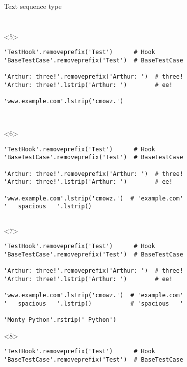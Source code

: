 \begin{frame}[fragile]{Text sequence type}
\begin{columns}[onlytextwidth]
\begin{column}{\textwidth}
\begin{onlyenv}
\begin{lstlisting}[style=python,basicstyle=\ttfamily\small,keepspaces=true,columns=fullflexible]
 \end{lstlisting}
      \end{onlyenv}

      \begin{onlyenv}<5>
        \begin{lstlisting}[style=python,basicstyle=\ttfamily\small,keepspaces=true,columns=fullflexible]
'TestHook'.removeprefix('Test')      # Hook
'BaseTestCase'.removeprefix('Test')  # BaseTestCase

'Arthur: three!'.removeprefix('Arthur: ')  # three!
'Arthur: three!'.lstrip('Arthur: ')        # ee!

'www.example.com'.lstrip('cmowz.')



 \end{lstlisting}
      \end{onlyenv}

      \begin{onlyenv}<6>
        \begin{lstlisting}[style=python,basicstyle=\ttfamily\small,keepspaces=true,columns=fullflexible]
'TestHook'.removeprefix('Test')      # Hook
'BaseTestCase'.removeprefix('Test')  # BaseTestCase

'Arthur: three!'.removeprefix('Arthur: ')  # three!
'Arthur: three!'.lstrip('Arthur: ')        # ee!

'www.example.com'.lstrip('cmowz.')  # 'example.com'
'   spacious   '.lstrip()


 \end{lstlisting}
      \end{onlyenv}

      \begin{onlyenv}<7>
        \begin{lstlisting}[style=python,basicstyle=\ttfamily\small,keepspaces=true,columns=fullflexible]
'TestHook'.removeprefix('Test')      # Hook
'BaseTestCase'.removeprefix('Test')  # BaseTestCase

'Arthur: three!'.removeprefix('Arthur: ')  # three!
'Arthur: three!'.lstrip('Arthur: ')        # ee!

'www.example.com'.lstrip('cmowz.')  # 'example.com'
'   spacious   '.lstrip()           # 'spacious   '

'Monty Python'.rstrip(' Python')
 \end{lstlisting}
      \end{onlyenv}

      \begin{onlyenv}<8>
        \begin{lstlisting}[style=python,basicstyle=\ttfamily\small,keepspaces=true,columns=fullflexible]
'TestHook'.removeprefix('Test')      # Hook
'BaseTestCase'.removeprefix('Test')  # BaseTestCase


\end{lstlisting}
\end{onlyenv}
\end{column}
\end{columns}
\end{frame}
